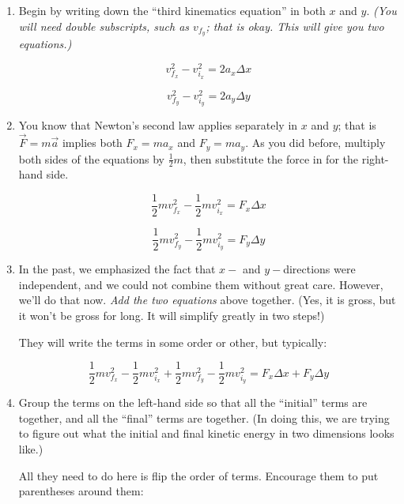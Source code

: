 \documentclass[12pt]{article}
\begin{document}
\begin{enumerate}
\item Begin by writing down the ``third kinematics equation'' in both $x$ and $y$. {\it (You will need double subscripts, such as $v_{f_y}$; that is okay. This will give you two equations.)}

{\color{Red}
	
	$$
	v_{f_x}^2 - 	 v_{i_x}^2 = 2 a_x  \Delta x $$
	
	$$v_{f_y}^2 - 	v_{i_y}^2 = 2 a_y \Delta y $$


}

\vspace{2in}

\item You know that Newton's second law applies separately in $x$ and $y$; that is $\vec F = m \vec a$ implies both $F_x = m a_x$ and $F_y = m a_y$. As you did before, multiply both sides of the equations by $\frac {1}{2}m$, then substitute the force in for the right-hand side.

{\color{Red}

$$
\frac{1}{2}mv_{f_x}^2 - 	\frac{1}{2}mv_{i_x}^2 = F_x \Delta x $$

$$
\frac{1}{2}mv_{f_y}^2 - 	\frac{1}{2}mv_{i_y}^2 = F_y \Delta y $$
}

\item In the past, we emphasized the fact that $x-$ and $y-$directions were independent, and we could not combine them without great care. However, we'll do that now. {\it Add the two equations} above together. (Yes, it is gross, but it won't be gross for long. It will simplify greatly in two steps!)

{\color{Red}

They will write the terms in some order or other, but typically:

$$
\frac{1}{2}mv_{f_x}^2 - 	\frac{1}{2}mv_{i_x}^2 + \frac{1}{2}mv_{f_y}^2 - 	\frac{1}{2}mv_{i_y}^2 = F_x \Delta x + F_y \Delta y$$


}

\vspace{1in}
\newpage

\item Group the terms on the left-hand side so that all the ``initial'' terms are together, and all the ``final'' terms are together. (In doing this, we are trying to figure out what the initial and final kinetic energy in two dimensions looks like.) 

{\color{Red}
All they need to do here is flip the order of terms. Encourage them to put parentheses around them:

}
\end{enumerate}
\end{document}

